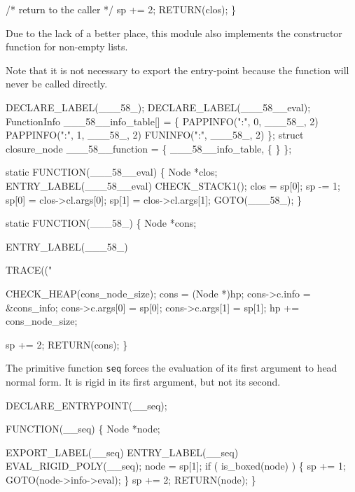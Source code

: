     /* return to the caller */
    sp += 2;
    RETURN(clos);
\}

\nwendcode{}\nwdocspar
Due to the lack of a better place, this module also implements the
constructor function for non-empty lists.

Note that it is not necessary to export the entry-point because the
function will never be called directly.

\nwenddocs{}\plusendmoddef\nwstartdeflinemarkup{}\nwenddeflinemarkup
DECLARE_LABEL(___58_);
DECLARE_LABEL(___58__eval);
FunctionInfo ___58__info_table[] = \{
    PAPPINFO(":", 0, ___58_, 2)
    PAPPINFO(":", 1, ___58_, 2)
    FUNINFO(":",     ___58_, 2)
\};
struct closure_node ___58__function = \{ ___58__info_table, \{ \} \};

static
FUNCTION(___58__eval)
\{
    Node *clos;
 ENTRY_LABEL(___58__eval)
    CHECK_STACK1();
    clos  = sp[0];
    sp   -= 1;
    sp[0] = clos->cl.args[0];
    sp[1] = clos->cl.args[1];
    GOTO(___58_);
\}

static
FUNCTION(___58_)
\{
    Node *cons;

 ENTRY_LABEL(___58_)

    TRACE(("%

    CHECK_HEAP(cons_node_size);
    cons            = (Node *)hp;
    cons->c.info    = &cons_info;
    cons->c.args[0] = sp[0];
    cons->c.args[1] = sp[1];
    hp             += cons_node_size;

    sp += 2;
    RETURN(cons);
\}

\nwendcode{}\nwdocspar
The primitive function \texttt{seq} forces the evaluation of its
first argument to head normal form. It is rigid in its first argument,
but not its second.

\nwenddocs{}\plusendmoddef\nwstartdeflinemarkup{}\nwenddeflinemarkup
DECLARE_ENTRYPOINT(__seq);

FUNCTION(__seq)
\{
    Node *node;

    EXPORT_LABEL(__seq)
 ENTRY_LABEL(__seq)
    EVAL_RIGID_POLY(__seq);
    node = sp[1];
    if ( is_boxed(node) )
    \{
        sp += 1;
        GOTO(node->info->eval);
    \}
    sp += 2;
    RETURN(node);
\}

